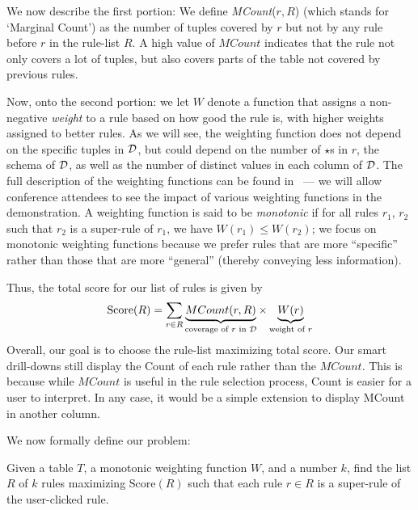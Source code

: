 We now describe the first portion:
We define {\em MCount}($r, R$) (which stands for `Marginal Count') as the number of tuples covered by $r$ but not by any rule before $r$ in the rule-list $R$. A high value of $MCount$ indicates that the rule not only covers a lot of tuples, but also covers parts of the table not covered by previous rules. 

Now, onto the second portion: we let $W$ denote a function that assigns a non-negative {\em weight} to a rule based on how good the rule is, with higher weights assigned to better rules. 
As we will see, the weighting function does not depend on the specific
tuples in $\mathcal{D}$, but could 
depend on the number of $\star$s in $r$,
the schema of $\mathcal{D}$, 
as well as the number of distinct values in each column of $\mathcal{D}$. The full description of the weighting functions
can be found in~\cite{tr} --- we will allow conference attendees to see the impact of various weighting functions
in the demonstration.
A weighting function is said to be {\em monotonic} if for all rules $r_1$, $r_2$ such that $r_2$ is a super-rule of $r_1$, we have $W(r_1) \leq W(r_2)$; we focus
on monotonic weighting functions because we prefer 
rules that are more ``specific''
rather than those that are more ``general'' 
(thereby conveying less information). 

Thus, the total score for our list of rules is given by 
$$\text{Score}(R) = \sum_{r \in R} \underbrace{MCount(r, R)}_{\text{coverage of $r$ in $\mathcal{D}$}} \times \underbrace{W(r)}_{\text{weight of $r$}}$$ 
Overall, our goal is to choose the rule-list maximizing 
total score. 
Our smart drill-downs still display the Count of each rule rather than the $MCount$. This is because while $MCount$ is useful in the rule selection process, Count is easier for a user to interpret. In any case, it would be a simple extension to display MCount in another column.

 We now formally define our problem:
\begin{problem}\label{prob:optimal-subrule-list}
Given a table $T$, a monotonic weighting function $W$, and a number $k$, find the list $R$ of $k$ rules maximizing $\text{Score}(R)$
such that each rule $r \in R$ is a super-rule of the user-clicked rule.
\end{problem}
